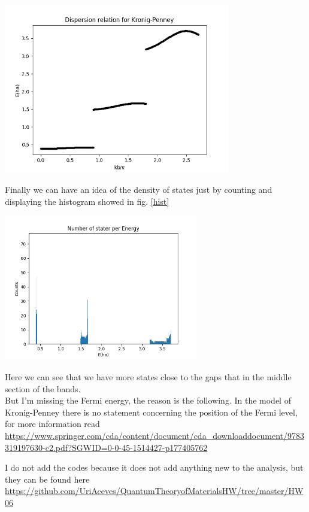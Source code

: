 \begin{questions}
\begin{solution}
 \begin{center}
   \includegraphics[width=99mm]{numsol}
 \end{center}

 \label{num}\vspace{0.5cm}

Finally we can have an idea of the density of states just by counting and displaying the histogram showed in fig. \ref{hist}

\begin{center}
  \includegraphics[width=85mm]{hist}
\end{center}

\label{hist}\vspace{0.5cm}

Here we can see that we have more states close to the gaps that in the middle section of the bands.\\

 But I'm missing the Fermi energy, the reason is the following. In the model of Kronig-Penney there is no statement concerning the position of the Fermi level, for more information read \url{https://www.springer.com/cda/content/document/cda_downloaddocument/9783319197630-c2.pdf?SGWID=0-0-45-1514427-p177405762}

 I do not add the codes because it does not add anything new to the analysis, but they can be found here \url{https://github.com/UriAceves/QuantumTheoryofMaterialsHW/tree/master/HW06}

 \end{solution}

\end{questions}

%
%
